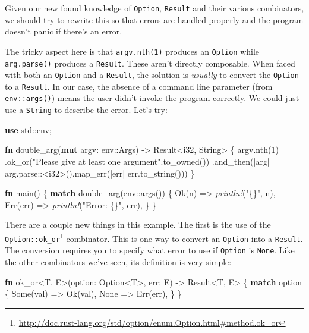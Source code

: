 \documentclass[a4paper,]{book}
\newenvironment{Shaded}{\begin{snugshade}}{\end{snugshade}}
\newcommand{\KeywordTok}[1]{\textcolor[rgb]{0.13,0.29,0.53}{\textbf{{#1}}}}
\newcommand{\DataTypeTok}[1]{\textcolor[rgb]{0.13,0.29,0.53}{{#1}}}
\newcommand{\DecValTok}[1]{\textcolor[rgb]{0.00,0.00,0.81}{{#1}}}
\newcommand{\ConstantTok}[1]{\textcolor[rgb]{0.00,0.00,0.00}{{#1}}}
\newcommand{\StringTok}[1]{\textcolor[rgb]{0.31,0.60,0.02}{{#1}}}
\newcommand{\PreprocessorTok}[1]{\textcolor[rgb]{0.56,0.35,0.01}{\textit{{#1}}}}
\newcommand{\NormalTok}[1]{{#1}}
\renewcommand{\href}[2]{#2\footnote{\url{#1}}}
\begin{document}
Given our new found knowledge of \texttt{Option}, \texttt{Result} and
their various combinators, we should try to rewrite this so that errors
are handled properly and the program doesn't panic if there's an error.

The tricky aspect here is that \texttt{argv.nth(1)} produces an
\texttt{Option} while \texttt{arg.parse()} produces a \texttt{Result}.
These aren't directly composable. When faced with both an
\texttt{Option} and a \texttt{Result}, the solution is \emph{usually} to
convert the \texttt{Option} to a \texttt{Result}. In our case, the
absence of a command line parameter (from \texttt{env::args()}) means
the user didn't invoke the program correctly. We could just use a
\texttt{String} to describe the error. Let's try:

\begin{Shaded}
\begin{Highlighting}[]
\KeywordTok{use} \NormalTok{std::env;}

\KeywordTok{fn} \NormalTok{double_arg(}\KeywordTok{mut} \NormalTok{argv: env::Args) -> }\DataTypeTok{Result}\NormalTok{<}\DataTypeTok{i32}\NormalTok{, }\DataTypeTok{String}\NormalTok{> \{}
    \NormalTok{argv.nth(}\DecValTok{1}\NormalTok{)}
        \NormalTok{.ok_or(}\StringTok{"Please give at least one argument"}\NormalTok{.to_owned())}
        \NormalTok{.and_then(|arg| arg.parse::<}\DataTypeTok{i32}\NormalTok{>().map_err(|err| err.to_string()))}
\NormalTok{\}}

\KeywordTok{fn} \NormalTok{main() \{}
    \KeywordTok{match} \NormalTok{double_arg(env::args()) \{}
        \ConstantTok{Ok}\NormalTok{(n) => }\PreprocessorTok{println!}\NormalTok{(}\StringTok{"\{\}"}\NormalTok{, n),}
        \ConstantTok{Err}\NormalTok{(err) => }\PreprocessorTok{println!}\NormalTok{(}\StringTok{"Error: \{\}"}\NormalTok{, err),}
    \NormalTok{\}}
\NormalTok{\}}
\end{Highlighting}
\end{Shaded}

There are a couple new things in this example. The first is the use of
the
\href{http://doc.rust-lang.org/std/option/enum.Option.html\#method.ok_or}{\texttt{Option::ok\_or}}
combinator. This is one way to convert an \texttt{Option} into a
\texttt{Result}. The conversion requires you to specify what error to
use if \texttt{Option} is \texttt{None}. Like the other combinators
we've seen, its definition is very simple:

\begin{Shaded}
\begin{Highlighting}[]
\KeywordTok{fn} \NormalTok{ok_or<T, E>(option: }\DataTypeTok{Option}\NormalTok{<T>, err: E) -> }\DataTypeTok{Result}\NormalTok{<T, E> \{}
    \KeywordTok{match} \NormalTok{option \{}
        \ConstantTok{Some}\NormalTok{(val) => }\ConstantTok{Ok}\NormalTok{(val),}
        \ConstantTok{None} \NormalTok{=> }\ConstantTok{Err}\NormalTok{(err),}
    \NormalTok{\}}
\NormalTok{\}}
\end{Highlighting}
\end{Shaded}
\end{document}
